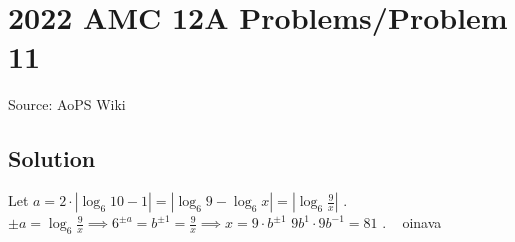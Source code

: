 \documentclass[12pt]{article}
\begin{document}
\section*{{2022 AMC 12A Problems/Problem 11}}
Source: AoPS Wiki

\subsection*{Solution}
Let $a = 2 \cdot |\log_6 10 - 1| = |\log_6 9 - \log_6 x| = \left|\log_6 \frac{9}{x}\right|$ . $\pm a = \log_6 \frac{9}{x} \implies 6^{\pm a} = b^{\pm 1} = \frac{9}{x} \implies x = 9 \cdot b^{\pm 1}$ $9b^1 \cdot 9b^{-1} = \boxed{81}$ . ~ oinava
\end{document}
